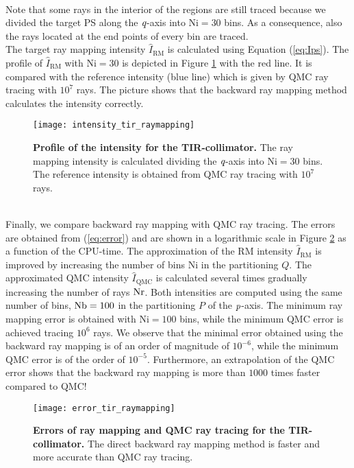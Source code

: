 \\ \indent Note that some rays in the interior of the regions are still traced because we divided the target PS along the $\textit{q}$-axis into $\textrm{Ni}=30$ bins. As a consequence, also the rays located at the end points of every bin are traced. \\
\indent The target ray mapping intensity $\hat{I}_{\textrm{RM}}$ is calculated using Equation (\ref{eq:Ips}). The profile of $\hat{I}_{\textrm{RM}}$ with $\textrm{Ni}=30$ is depicted in Figure \ref{fig:intensity_tir_raymapping} with the red line. It is compared with the reference intensity (blue line) which is given by QMC ray tracing with $10^7$ rays. The picture shows that the backward ray mapping method calculates the intensity correctly.
\begin{figure}[t]
  \begin{center}
  \texttt{[image: intensity\_tir\_raymapping]}
  \end{center}
  \caption{\textbf{Profile of the intensity for the TIR-collimator.}
 The ray mapping intensity is calculated dividing the $\textit{q}$-axis into $\textrm{Ni}=30$ bins. The reference intensity is obtained from QMC ray tracing with $10^7$ rays.}
\label{fig:intensity_tir_raymapping}
 \end{figure}
\\ \indent 
Finally, we compare backward ray mapping with QMC ray tracing. The errors are obtained from (\ref{eq:error}) and are shown in a logarithmic scale in Figure \ref{fig:error_tir_raymapping} as a function of the CPU-time. The approximation of the RM intensity $\hat{I}_{\textrm{RM}}$ is improved by increasing the number of bins $\textrm{Ni}$ in the partitioning $Q$. The approximated QMC intensity $\hat{I}_{\textrm{QMC}}$ is calculated several times gradually increasing the number of rays $\textrm{Nr}$. Both intensities are computed using the same number of bins, $\textrm{Nb}=100$ in the partitioning $P$ of the $\textit{p}$-axis. The minimum ray mapping error is obtained with $\textrm{Ni}=100$ bins, while the minimum QMC error is achieved tracing $10^6$ rays. We observe that the minimal error obtained using the backward ray mapping is of an order of magnitude of $10^{-6}$, while the minimum QMC error is of the order of $10^{-5}$. Furthermore, an extrapolation of the QMC error shows that the backward ray mapping is more than $1000$ times faster compared to QMC!
\begin{figure}[t]
  \begin{center}
  \texttt{[image: error\_tir\_raymapping]}
  \end{center}
  \caption{\textbf{Errors of ray mapping and QMC ray tracing for the TIR-collimator.}
 The direct backward ray mapping method is faster and more accurate than QMC ray tracing.}
\label{fig:error_tir_raymapping}
 \end{figure}
